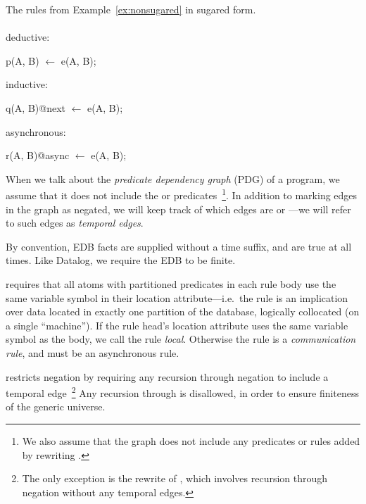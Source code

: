 \begin{example}
\label{ex:sugared}
The rules from Example~\ref{ex:nonsugared} in sugared form.
\\\\
deductive:
\begin{Dedalus}
p(A, B) \(\leftarrow\) e(A, B);
\end{Dedalus}
inductive:
\begin{Dedalus}
q(A, B)@next \(\leftarrow\) e(A, B);
\end{Dedalus}
asynchronous:
\begin{Dedalus}
r(A, B)@async \(\leftarrow\) e(A, B);
\end{Dedalus}
\end{example}

When we talk about the {\em predicate dependency graph} (PDG) of a \lang program, we assume that it does not include the  or  predicates~\footnote{We also assume that the graph does not include any predicates or rules added by rewriting .}.  In addition to marking edges in the graph as negated, we will keep track of which edges are  or ---we will refer to such edges as {\em temporal edges}.


\vspace{1em}
By convention, EDB facts are supplied without a time suffix, and are true at all times.  Like Datalog, we require the EDB to be finite.

\vspace{1em}
\lang requires that all atoms with partitioned predicates in each rule body use the same variable symbol in their location attribute---i.e.\ the rule is an implication over data located in exactly one partition of the database, logically collocated (on a single ``machine'').  If the rule head's location attribute uses the same variable symbol as the body, we call the rule {\em local}.  Otherwise the rule is a {\em communication rule}, and must be an asynchronous rule.                                                              

\vspace{1em}
\lang restricts negation by requiring any recursion through negation to include a temporal edge~\footnote{The only exception is the rewrite of , which involves recursion through negation without any temporal edges.}  Any recursion through  is disallowed, in order to ensure finiteness of the generic universe.


